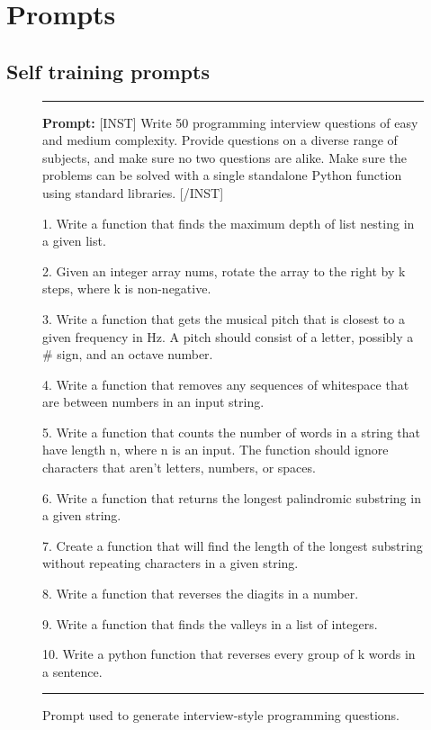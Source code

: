 \documentclass[10pt]{article}
\begin{document}
 \section{Prompts}
\subsection{Self training prompts}

\begin{figure}[h!]
\small
\noindent\rule{\textwidth}{1pt}
   \textbf{Prompt:} 
[INST] Write 50 programming interview questions of easy and medium complexity. 
Provide questions on a diverse range of subjects, and make sure no two questions are alike.
Make sure the problems can be solved with a single standalone Python function using standard libraries. [/INST]

1. Write a function that finds the maximum depth of list nesting in a given list.

2. Given an integer array nums, rotate the array to the right by k steps, where k is non-negative.

3. Write a function that gets the musical pitch that is closest to a given frequency in Hz. A pitch should consist of a letter, possibly a \# sign, and an octave number.

4. Write a function that removes any sequences of whitespace that are between numbers in an input string.

5. Write a function that counts the number of words in a string that have length n, where n is an input. The function should ignore characters that aren't letters, numbers, or spaces.

6. Write a function that returns the longest palindromic substring in a given string.

7. Create a function that will find the length of the longest substring without repeating characters in a given string.

8. Write a function that reverses the diagits in a number.

9. Write a function that finds the valleys in a list of integers.

10. Write a python function that reverses every group of k words in a sentence.    

\noindent\rule{\textwidth}{1pt}

\caption{Prompt used to generate interview-style programming questions.\label{fig:prompt_self_generation_prompts}}
\end{figure}
\end{document}
